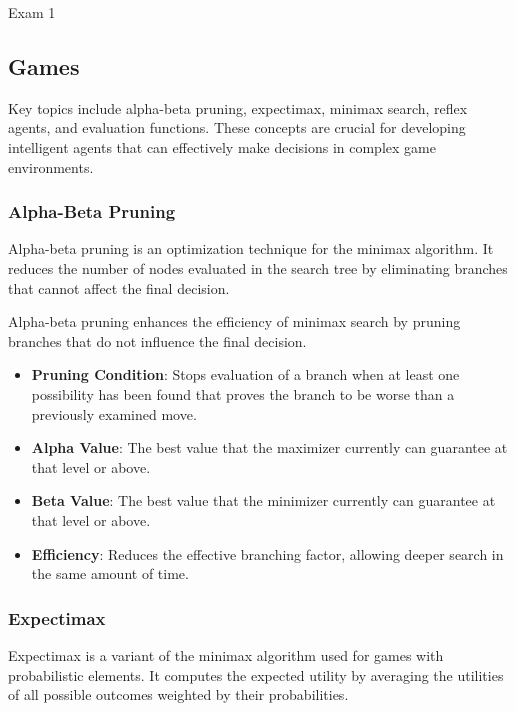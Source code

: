 \begin{examnotes}{Exam 1}
    \subsection*{Games}

    Key topics include alpha-beta pruning, expectimax, minimax search, reflex agents, and evaluation functions. These concepts are crucial for developing intelligent agents that can effectively make 
    decisions in complex game environments.
    
    \subsubsection*{Alpha-Beta Pruning}
    
    Alpha-beta pruning is an optimization technique for the minimax algorithm. It reduces the number of nodes evaluated in the search tree by eliminating branches that cannot affect the final decision.
    
    \begin{highlight}
        Alpha-beta pruning enhances the efficiency of minimax search by pruning branches that do not influence the final decision.
        
        \begin{itemize}
            \item \textbf{Pruning Condition}: Stops evaluation of a branch when at least one possibility has been found that proves the branch to be worse than a previously examined move.
            \item \textbf{Alpha Value}: The best value that the maximizer currently can guarantee at that level or above.
            \item \textbf{Beta Value}: The best value that the minimizer currently can guarantee at that level or above.
            \item \textbf{Efficiency}: Reduces the effective branching factor, allowing deeper search in the same amount of time.
        \end{itemize}
    \end{highlight}
    
    \subsubsection*{Expectimax}
    
    Expectimax is a variant of the minimax algorithm used for games with probabilistic elements. It computes the expected utility by averaging the utilities of all possible outcomes weighted by their probabilities.
    

\end{examnotes}
